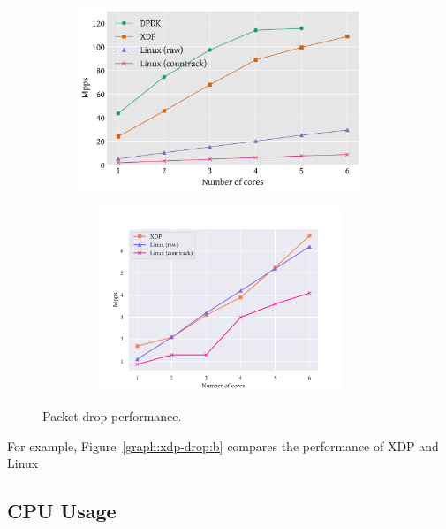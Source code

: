 \documentclass[12pt,titlepage]{article}
\begin{document}
\begin{figure}
    \centering
    \begin{minipage}{0.49\textwidth}
        \centering
        \includegraphics[width=0.95\textwidth,height=5.5cm]{original/drop-test.pdf} %
        \label{graph:xdp-drop:a}
    \end{minipage}\hfill
    \begin{minipage}{0.49\textwidth}
        \centering
        \includegraphics[width=0.95\textwidth,height=5.5cm]{img/drop-test.pdf} %
        \label{graph:xdp-drop:b}
    \end{minipage}
     \caption{Packet drop performance.}
     \label{graph:xdp-drop}
\end{figure}

For example, Figure~\ref{graph:xdp-drop:b} compares the performance of XDP and Linux

\subsection{CPU Usage}
\end{document}
